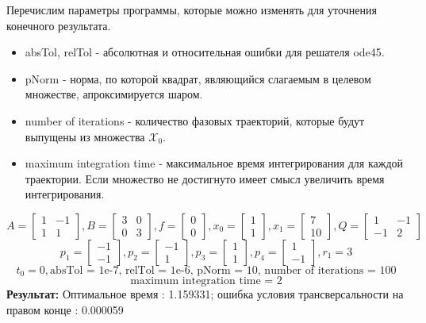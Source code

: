 \documentclass[10pt]{article}
\begin{document}
Перечислим параметры программы, которые можно изменять для уточнения конечного результата. 
\begin{itemize}
	\item absTol, relTol - абсолютная и относительная ошибки для решателя ode45.
	\item pNorm - норма, по которой квадрат, являющийся слагаемым в целевом множестве, апроксимируется шаром.
	\item number of iterations - количество фазовых траекторий, которые будут выпущены из множества \( \mathcal{X}_0 \). 
	\item maximum integration time - максимальное время интегрирования для каждой траектории. Если множество не достигнуто имеет смысл увеличить время интегрирования.
\end{itemize}
\newpage
{}
\[ A = \begin{bmatrix}
      		1 & -1 \\[0.3em]
      		1 & 1
      	  \end{bmatrix} , 
 B = \begin{bmatrix}
      	   3 & 0 \\[0.3em]
      	   0 & 3
      \end{bmatrix} ,
 f = \begin{bmatrix}
       	    0 \\[0.3em]
      	    0
      \end{bmatrix} ,
 x_0 = \begin{bmatrix}
      	    1 \\[0.3em]
      	    1
      \end{bmatrix} ,
 x_1 = \begin{bmatrix}
      	7 \\[0.3em]
      	10
      \end{bmatrix} ,
 Q = \begin{bmatrix}
      	   1 & -1 \\[0.3em]
      	   -1 & 2
      \end{bmatrix} \]
\[ p_1 = \begin{bmatrix}
      	-1 \\[0.3em]
      	-1
      \end{bmatrix} ,
p_2 = \begin{bmatrix}
      	-1 \\[0.3em]
      	1
      \end{bmatrix} ,
p_3 = \begin{bmatrix}
      	1 \\[0.3em]
      	1
      \end{bmatrix} ,
p_4 = \begin{bmatrix}
      	1 \\[0.3em]
      	-1
      \end{bmatrix}, r_1 = 3 \]
\[ t_0 = 0, \text{absTol = 1e-7, relTol = 1e-6, pNorm = 10, number of iterations = 100}\]  
\[\text{maximum integration time = 2} \]
\textbf{Результат:} Оптимальное время : 1.159331; ошибка условия трансверсальности на правом конце : 0.000059 
\end{document}
